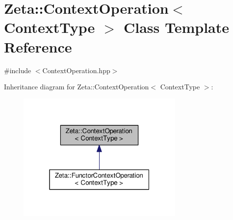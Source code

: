 \hypertarget{classZeta_1_1ContextOperation}{\section{Zeta\+:\+:Context\+Operation$<$ Context\+Type $>$ Class Template Reference}
\label{classZeta_1_1ContextOperation}
}


{\ttfamily \#include $<$Context\+Operation.\+hpp$>$}



Inheritance diagram for Zeta\+:\+:Context\+Operation$<$ Context\+Type $>$\+:\nopagebreak
\begin{figure}[H]
\begin{center}
\leavevmode
\includegraphics[width=232pt]{classZeta_1_1ContextOperation__inherit__graph}
\end{center}
\end{figure}
